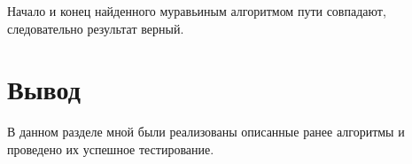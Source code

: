 Начало и конец найденного муравьиным алгоритмом пути совпадают, следовательно результат верный.


\section*{Вывод}

В данном разделе мной были реализованы описанные ранее алгоритмы и проведено их успешное тестирование.

\clearpage
